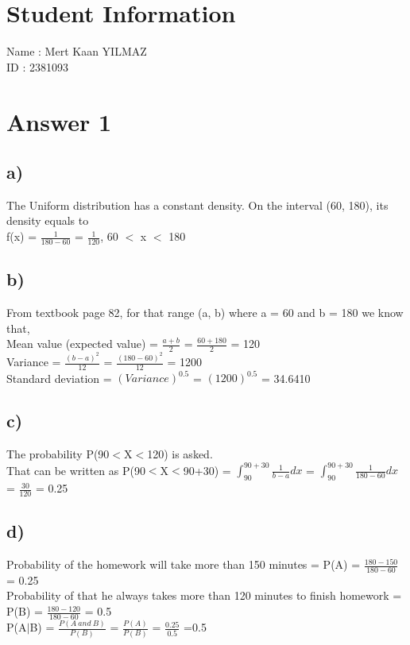 \documentclass[12pt]{article}
\begin{document}
\section*{Student Information}

Name : Mert Kaan YILMAZ\\

ID : 2381093\\


\section*{Answer 1}
\subsection*{a)}\noindent 
The Uniform distribution has a constant density. On the interval (60, 180), its density equals to\\
f(x) = $\frac{1}{180-60}$ = $\frac{1}{120}$, 60 $<$ x $<$ 180

\subsection*{b)}\noindent 
From textbook page 82, for that range (a, b) where a = 60 and b = 180 we know that,\\
Mean value (expected value) = $\frac{a+b}{2}$ = $\frac{60+180}{2}$  = 120\\
Variance = $\frac{(b-a)^2}{12}$ = $\frac{(180-60)^2}{12}$ = 1200\\
Standard deviation = $(Variance)^{0.5}$ = $(1200)^{0.5}$ = 34.6410

\subsection*{c)}\noindent 
The probability P(90$<$X$<$120) is asked.\\
That can be written as P(90$<$X$<$90+30) = $ \int_{90}^{90+30} \frac{1}{b-a} dx$ = $ \int_{90}^{90+30} \frac{1}{180-60} dx$ = $\frac{30}{120}$ = 0.25

\subsection*{d)}\noindent 
Probability of the homework will take more than 150 minutes = P(A) = $\frac{180-150}{180-60}$ = 0.25\\
Probability of that he always takes more than 120 minutes to finish homework = P(B) = $\frac{180-120}{180-60}$ = 0.5\\
P(A$|$B) = $\frac{P(A\:and\:B)}{P(B)}$ = $\frac{P(A)}{P(B)}$ = $\frac{0.25}{0.5}$ =0.5
\end{document}
